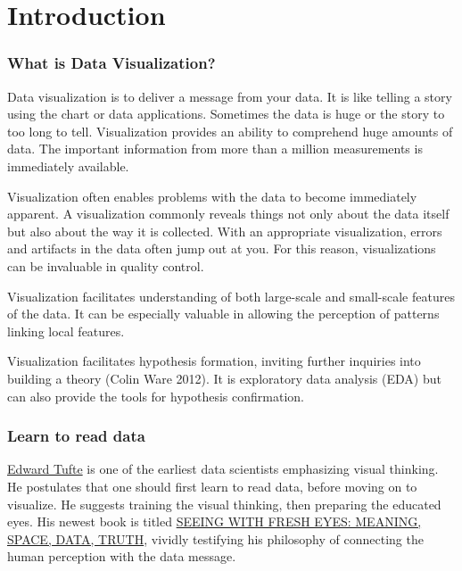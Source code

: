 \documentclass[
]{book}
\begin{document}
\hypertarget{intro}{%
\chapter{Introduction}\label{intro}}

\hypertarget{what-is-data-visualization}{%
\subsection{What is Data Visualization?}\label{what-is-data-visualization}}

Data visualization is to deliver a message from your data. It is like telling a story using the chart or data applications. Sometimes the data is huge or the story to too long to tell. Visualization provides an ability to comprehend huge amounts of data. The important information from more than a million measurements is immediately available.

Visualization often enables problems with the data to become immediately apparent. A visualization commonly reveals things not only about the data itself but also about the way it is collected. With an appropriate visualization, errors and artifacts in the data often jump out at you. For this reason, visualizations can be invaluable in quality control.

Visualization facilitates understanding of both large-scale and small-scale features of the data. It can be especially valuable in allowing the perception of patterns linking local features.

Visualization facilitates hypothesis formation, inviting further inquiries into building a theory (Colin Ware 2012). It is exploratory data analysis (EDA) but can also provide the tools for hypothesis confirmation.

\hypertarget{learn-to-read-data}{%
\subsection{Learn to read data}\label{learn-to-read-data}}

\href{https://www.edwardtufte.com/tufte/}{Edward Tufte} is one of the earliest data scientists emphasizing visual thinking. He postulates that one should first learn to read data, before moving on to visualize. He suggests training the visual thinking, then preparing the educated eyes. His newest book is titled \href{https://www.edwardtufte.com/tufte/seeing-with-fresh-eyes}{SEEING WITH FRESH EYES: MEANING, SPACE, DATA, TRUTH}, vividly testifying his philosophy of connecting the human perception with the data message.
\end{document}
